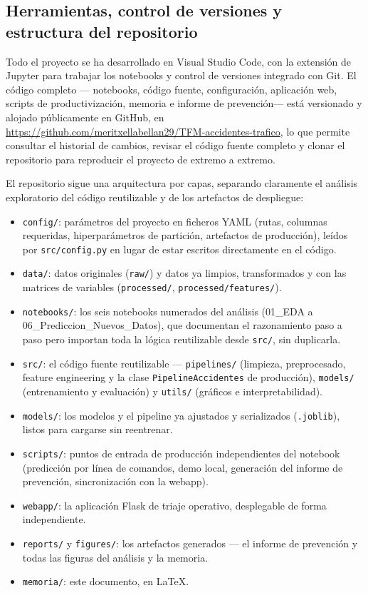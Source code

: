 \documentclass[11pt,a4paper]{article}
\begin{document}
\subsection{Herramientas, control de versiones y estructura del repositorio}

Todo el proyecto se ha desarrollado en Visual Studio Code, con la extensión de Jupyter para trabajar los notebooks y control de versiones integrado con Git. El código completo --- notebooks, código fuente, configuración, aplicación web, scripts de productivización, memoria e informe de prevención--- está versionado y alojado públicamente en GitHub, en \url{https://github.com/meritxellabellan29/TFM-accidentes-trafico}, lo que permite consultar el historial de cambios, revisar el código fuente completo y clonar el repositorio para reproducir el proyecto de extremo a extremo.

El repositorio sigue una arquitectura por capas, separando claramente el análisis exploratorio del código reutilizable y de los artefactos de despliegue:

\begin{itemize}[itemsep=2pt]
\item \texttt{config/}: parámetros del proyecto en ficheros YAML (rutas, columnas requeridas, hiperparámetros de partición, artefactos de producción), leídos por \texttt{src/config.py} en lugar de estar escritos directamente en el código.
\item \texttt{data/}: datos originales (\texttt{raw/}) y datos ya limpios, transformados y con las matrices de variables (\texttt{processed/}, \texttt{processed/features/}).
\item \texttt{notebooks/}: los seis notebooks numerados del análisis (01\_EDA a 06\_Prediccion\_Nuevos\_Datos), que documentan el razonamiento paso a paso pero importan toda la lógica reutilizable desde \texttt{src/}, sin duplicarla.
\item \texttt{src/}: el código fuente reutilizable --- \texttt{pipelines/} (limpieza, preprocesado, feature engineering y la clase \texttt{PipelineAccidentes} de producción), \texttt{models/} (entrenamiento y evaluación) y \texttt{utils/} (gráficos e interpretabilidad).
\item \texttt{models/}: los modelos y el pipeline ya ajustados y serializados (\texttt{.joblib}), listos para cargarse sin reentrenar.
\item \texttt{scripts/}: puntos de entrada de producción independientes del notebook (predicción por línea de comandos, demo local, generación del informe de prevención, sincronización con la webapp).
\item \texttt{webapp/}: la aplicación Flask de triaje operativo, desplegable de forma independiente.
\item \texttt{reports/} y \texttt{figures/}: los artefactos generados --- el informe de prevención y todas las figuras del análisis y la memoria.
\item \texttt{memoria/}: este documento, en \LaTeX.
\end{itemize}
\end{document}

